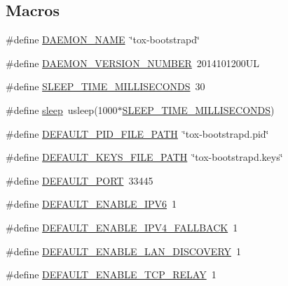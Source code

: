 \subsection*{Macros}
\begin{DoxyCompactItemize}
\item 
\#define \hyperlink{tox-bootstrapd_8c_a5ea777c6fb1dd39fda46cdf97a6949a5}{D\+A\+E\+M\+O\+N\+\_\+\+N\+A\+M\+E}~\char`\"{}tox-\/bootstrapd\char`\"{}
\item 
\#define \hyperlink{tox-bootstrapd_8c_a63112447ca129c284247c8b29b32b838}{D\+A\+E\+M\+O\+N\+\_\+\+V\+E\+R\+S\+I\+O\+N\+\_\+\+N\+U\+M\+B\+E\+R}~2014101200\+U\+L
\item 
\#define \hyperlink{tox-bootstrapd_8c_afb56b9187945a9a5a8ae0b48fb918b37}{S\+L\+E\+E\+P\+\_\+\+T\+I\+M\+E\+\_\+\+M\+I\+L\+L\+I\+S\+E\+C\+O\+N\+D\+S}~30
\item 
\#define \hyperlink{tox-bootstrapd_8c_acc8612feeec5f569b1e096e3110d0dca}{sleep}~usleep(1000$\ast$\hyperlink{tox-bootstrapd_8c_afb56b9187945a9a5a8ae0b48fb918b37}{S\+L\+E\+E\+P\+\_\+\+T\+I\+M\+E\+\_\+\+M\+I\+L\+L\+I\+S\+E\+C\+O\+N\+D\+S})
\item 
\#define \hyperlink{tox-bootstrapd_8c_a3229500bf4d840c088746e1a6482210d}{D\+E\+F\+A\+U\+L\+T\+\_\+\+P\+I\+D\+\_\+\+F\+I\+L\+E\+\_\+\+P\+A\+T\+H}~\char`\"{}tox-\/bootstrapd.\+pid\char`\"{}
\item 
\#define \hyperlink{tox-bootstrapd_8c_a1bdc61234638275814834465df95908a}{D\+E\+F\+A\+U\+L\+T\+\_\+\+K\+E\+Y\+S\+\_\+\+F\+I\+L\+E\+\_\+\+P\+A\+T\+H}~\char`\"{}tox-\/bootstrapd.\+keys\char`\"{}
\item 
\#define \hyperlink{tox-bootstrapd_8c_a16b710f592bf8f7900666392adc444dc}{D\+E\+F\+A\+U\+L\+T\+\_\+\+P\+O\+R\+T}~33445
\item 
\#define \hyperlink{tox-bootstrapd_8c_a67663ba00c576efce1226a3fd856cba6}{D\+E\+F\+A\+U\+L\+T\+\_\+\+E\+N\+A\+B\+L\+E\+\_\+\+I\+P\+V6}~1
\item 
\#define \hyperlink{tox-bootstrapd_8c_a51d848d37bbf1d506ca14f83ddd2e342}{D\+E\+F\+A\+U\+L\+T\+\_\+\+E\+N\+A\+B\+L\+E\+\_\+\+I\+P\+V4\+\_\+\+F\+A\+L\+L\+B\+A\+C\+K}~1
\item 
\#define \hyperlink{tox-bootstrapd_8c_a78c8c9f7a2ece92a6e6cab895c88962e}{D\+E\+F\+A\+U\+L\+T\+\_\+\+E\+N\+A\+B\+L\+E\+\_\+\+L\+A\+N\+\_\+\+D\+I\+S\+C\+O\+V\+E\+R\+Y}~1
\item 
\#define \hyperlink{tox-bootstrapd_8c_acfa79b0cd7c40eb8d55462d8b8fa0e17}{D\+E\+F\+A\+U\+L\+T\+\_\+\+E\+N\+A\+B\+L\+E\+\_\+\+T\+C\+P\+\_\+\+R\+E\+L\+A\+Y}~1
\item 

\end{DoxyCompactItemize}

